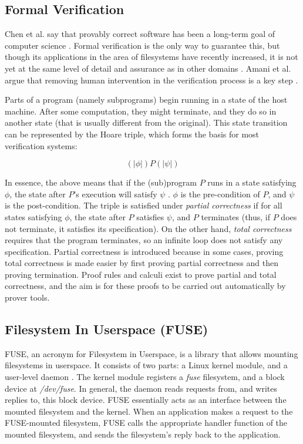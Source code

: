 \subsection{Formal Verification}
Chen et al. say that provably correct software has been a long-term goal of computer science \cite{chen2015specifying}.
Formal verification is the only way to guarantee this, but though its applications in the area of filesystems have recently increased, it is not yet at the same level of detail and assurance as in other domains \cite{amani2016}.
Amani et al. argue that removing human intervention in the verification process is a key step \cite{amani2016}.

Parts of a program (namely subprograms) begin running in a state of the host machine.
After some computation, they might terminate, and they do so in another state (that is usually different from the original).
This state transition can be represented by the Hoare triple, which forms the basis for most verification systems:

$$(\!|\phi|\!) P (\!|\psi|\!)$$

In essence, the above means that if the (sub)program $P$ runs in a state satisfying $\phi$, the state after $P$'s execution will satisfy $\psi$ \cite{huth2004}.
$\phi$ is the pre-condition of $P$, and $\psi$ is the post-condition.
The triple is satisfied under \textit{partial correctness} if for all states satisfying $\phi$, the state after $P$ satisfies $\psi$, and $P$ terminates (thus, if $P$ does not terminate, it satisfies its specification).
On the other hand, \textit{total correctness} requires that the program terminates, so an infinite loop does not satisfy any specification.
Partial correctness is introduced because in some cases, proving total correctness is made easier by first proving partial correctness and then proving termination.
Proof rules and calculi exist to prove partial and total correctness, and the aim is for these proofs to be carried out automatically by prover tools.

\subsection{Filesystem In Userspace (FUSE)}
FUSE, an acronym for Filesystem in Userspace, is a library that allows mounting filesystems in userspace.
It consists of two parts: a Linux kernel module, and a user-level daemon \cite{vangoor2017}.
The kernel module registers a \textit{fuse} filesystem, and a block device at \textit{/dev/fuse}.
In general, the daemon reads requests from, and writes replies to, this block device.
FUSE essentially acts as an interface between the mounted filesystem and the kernel.
When an application makes a request to the FUSE-mounted filesystem, FUSE calls the appropriate handler function of the mounted filesystem, and sends the filesystem's reply back to the application.

